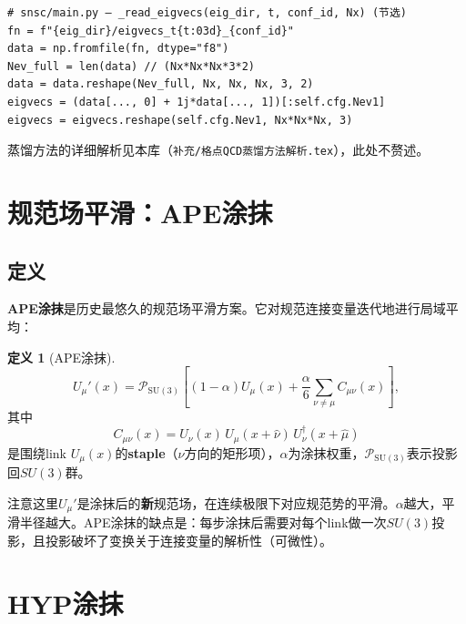 \documentclass[12pt,a4paper]{ctexart}
\theoremstyle{definition}
\newtheorem{definition}{定义}[section]
\begin{document}
\begin{verbatim}
# snsc/main.py — _read_eigvecs(eig_dir, t, conf_id, Nx) (节选)
fn = f"{eig_dir}/eigvecs_t{t:03d}_{conf_id}"
data = np.fromfile(fn, dtype="f8")
Nev_full = len(data) // (Nx*Nx*Nx*3*2)
data = data.reshape(Nev_full, Nx, Nx, Nx, 3, 2)
eigvecs = (data[..., 0] + 1j*data[..., 1])[:self.cfg.Nev1]
eigvecs = eigvecs.reshape(self.cfg.Nev1, Nx*Nx*Nx, 3)
\end{verbatim}

蒸馏方法的详细解析见本库\cite{DistillationDoc}（\texttt{补充/格点QCD蒸馏方法解析.tex}），此处不赘述。

\section{规范场平滑：APE涂抹}

\subsection{定义}

\textbf{APE涂抹}是历史最悠久的规范场平滑方案\cite{APE1987}。它对规范连接变量迭代地进行局域平均：

\begin{definition}[APE涂抹]
\begin{equation}
U_\mu'(x) = \mathcal{P}_{\mathrm{SU}(3)}\!\left[ (1-\alpha) U_\mu(x) + \frac{\alpha}{6} \sum_{\nu \ne \mu} C_{\mu\nu}(x) \right],
\label{eq:ape}
\end{equation}
其中
\begin{equation}
C_{\mu\nu}(x) = U_\nu(x)\, U_\mu(x+\hat\nu)\, U^\dagger_\nu(x+\hat\mu)
\label{eq:staple}
\end{equation}
是围绕link $U_\mu(x)$的\textbf{staple}（$\nu$方向的矩形项），$\alpha$为涂抹权重，$\mathcal{P}_{\mathrm{SU}(3)}$表示投影回$SU(3)$群。
\end{definition}

注意这里$U_\mu'$是涂抹后的\textbf{新}规范场，在连续极限下对应规范势的平滑。$\alpha$越大，平滑半径越大。APE涂抹的缺点是：每步涂抹后需要对每个link做一次$SU(3)$投影，且投影破坏了变换关于连接变量的解析性（可微性）。

\section{HYP涂抹}
\end{document}
